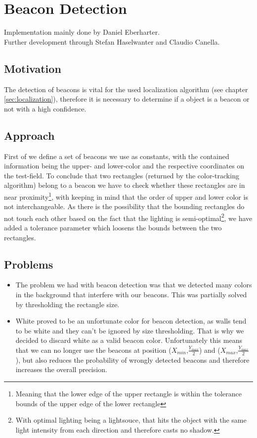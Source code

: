 \documentclass[703031]{iisreport}
\begin{document}
\section{Beacon Detection}
Implementation mainly done by Daniel Eberharter. \\
Further development through Stefan Haselwanter and Claudio Canella.

\subsection{Motivation}
The detection of beacons is vital for the used localization algorithm (see chapter \ref{sec:localization}), therefore it is necessary to determine if a object is a beacon or not with a high confidence.

\subsection{Approach}
First of we define a set of beacons we use as constants, with the contained information being the upper- and lower-color and the respective coordinates on the test-field. To conclude that two rectangles (returned by the color-tracking algorithm) belong to a beacon we have to check whether these rectangles are in near proximity\footnote{Meaning that the lower edge of the upper rectangle is within the tolerance bounds of the upper edge of the lower rectangle}, with keeping in mind that the order of upper and lower color is not interchangeable. 
As there is the possibility that the bounding rectangles do not touch each other based on the fact that the lighting is semi-optimal\footnote{With optimal lighting being a lightsouce, that hits the object with the same light intensity from each direction and therefore casts no shadow.}, we have added a tolerance parameter which loosens the bounds between the two rectangles.

\subsection{Problems}
	\begin{itemize}
		\item The problem we had with beacon detection was that we detected many colors in the background that interfere with our beacons. This was partially solved by thresholding the rectangle size.
		\item White proved to be an unfortunate color for beacon detection, as walls tend to be white and they can't be ignored by size thresholding. That is why we decided to discard white as a valid beacon color. Unfortunately this means that we can no longer use the beacons at position ($X_{min}$,$\frac{Y_{max}}{2}$) and ($X_{max}$,$\frac{Y_{max}}{2}$), but also reduces the probability of wrongly detected beacons and therefore increases the overall precision.
	\end{itemize}
\end{document}
